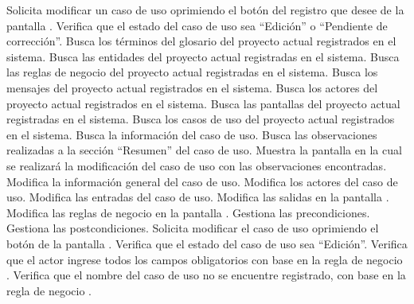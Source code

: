  \begin{UCtrayectoria}
    \UCpaso[\UCactor] Solicita modificar un caso de uso oprimiendo el botón \btnEditar del registro que desee de la pantalla .
	\UCpaso[\UCsist] Verifica que el estado del caso de uso sea ``Edición'' o ``Pendiente de corrección''. 
    \UCpaso[\UCsist] Busca los términos del glosario del proyecto actual registrados en el sistema. 
    \UCpaso[\UCsist] Busca las entidades del proyecto actual registradas en el sistema. 
    \UCpaso[\UCsist] Busca las reglas de negocio del proyecto actual registradas en el sistema. 
    \UCpaso[\UCsist] Busca los mensajes del proyecto actual registrados en el sistema. 
    \UCpaso[\UCsist] Busca los actores del proyecto actual registrados en el sistema. 
    \UCpaso[\UCsist] Busca las pantallas del proyecto actual registradas en el sistema. 
    \UCpaso[\UCsist] Busca los casos de uso del proyecto actual registrados en el sistema. 
	\UCpaso[\UCsist] Busca la información del caso de uso.
	\UCpaso[\UCsist] Busca las observaciones realizadas a la sección ``Resumen'' del caso de uso.
    \UCpaso[\UCsist] Muestra la pantalla  en la cual se realizará la modificación del caso de uso con las observaciones encontradas. 
    \UCpaso[\UCactor] Modifica la información general del caso de uso. \label{cu5.2:ingresaDatos}
    \UCpaso[\UCactor] Modifica los actores del caso de uso.  \label{cu5.2:ingresaActores}
    \UCpaso[\UCactor] Modifica las entradas del caso de uso.   \label{cu5.2:ingresaEntradas}
    \UCpaso[\UCactor] Modifica las salidas en la pantalla .    \label{cu5.2:ingresaSalidas}
    \UCpaso[\UCactor] Modifica las reglas de negocio en la pantalla .  \label{cu5.2:ingresaReglasNegocio}
	\UCpaso[\UCactor] Gestiona las precondiciones.\label{cu5.2:ingresaPrecond}
    \UCpaso[\UCactor] Gestiona las postcondiciones.\label{cu5.2:ingresaPostcond}
    \UCpaso[\UCactor] Solicita modificar el caso de uso oprimiendo el botón  de la pantalla . 
	\UCpaso[\UCsist] Verifica que el estado del caso de uso sea ``Edición''. 
    \UCpaso[\UCsist] Verifica que el actor ingrese todos los campos obligatorios con base en la regla de negocio  . 
	\UCpaso[\UCsist] Verifica que el nombre del caso de uso no se encuentre registrado, con base en la regla de negocio  . 

\end{UCtrayectoria}

